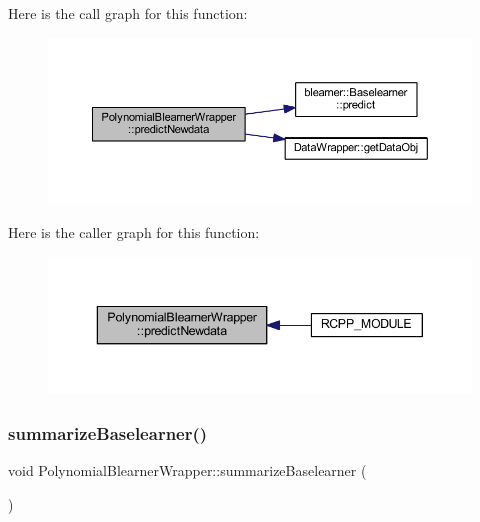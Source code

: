 Here is the call graph for this function\+:\nopagebreak
\begin{figure}[H]
\begin{center}
\leavevmode
\includegraphics[width=350pt]{class_polynomial_blearner_wrapper_aa3e9670a1e8efe6524e7bdf10a43e25c_cgraph}
\end{center}
\end{figure}
Here is the caller graph for this function\+:\nopagebreak
\begin{figure}[H]
\begin{center}
\leavevmode
\includegraphics[width=343pt]{class_polynomial_blearner_wrapper_aa3e9670a1e8efe6524e7bdf10a43e25c_icgraph}
\end{center}
\end{figure}
\mbox{\label{class_polynomial_blearner_wrapper_ad1eaf84c973c702c999af43fc23aeca2}} 
\subsubsection{\texorpdfstring{summarize\+Baselearner()}{summarizeBaselearner()}}
{\footnotesize\ttfamily void Polynomial\+Blearner\+Wrapper\+::summarize\+Baselearner (\begin{DoxyParamCaption}{ }\end{DoxyParamCaption})\hspace{0.3cm}{\ttfamily [inline]}}


